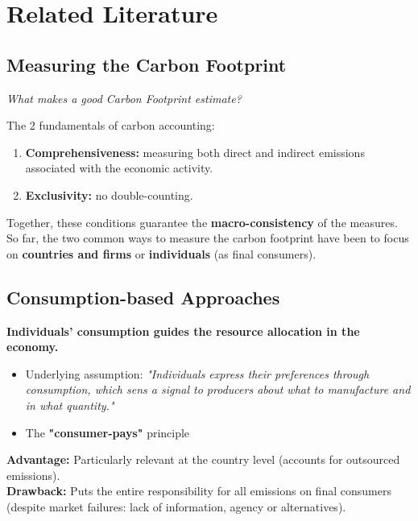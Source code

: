 \documentclass[10pt]{beamer}
\begin{document}
\section{Related Literature}
\begin{frame}
    \tableofcontents[currentsection, hideothersubsections, sections=\value{section}]
\end{frame}

\subsection{Measuring the Carbon Footprint}
\begin{frame}{\subsecname}

    \textit{What makes a good Carbon Footprint estimate?}
    
    The 2 fundamentals of carbon accounting:
        \begin{enumerate}
            \item \textbf{Comprehensiveness:} measuring both direct and indirect emissions associated with the economic activity.
            \item \textbf{Exclusivity:} no double-counting.
        \end{enumerate}
    
    Together, these conditions guarantee the \textbf{macro-consistency} of the measures. \\
    So far, the two common ways to measure the carbon footprint have been to focus on \textbf{countries and firms} or \textbf{individuals} (as final consumers).
\end{frame}

\subsection{Consumption-based Approaches}
\begin{frame}{\subsecname}
    \textbf{Individuals' consumption guides the resource allocation in the economy.}
        \begin{itemize}
            \item Underlying assumption: \textit{"Individuals express their preferences through consumption, which sens a signal to producers about what to manufacture and in what quantity."}
            \item The \textbf{"consumer-pays"} principle
        \end{itemize}
        \textbf{Advantage:} Particularly relevant at the country level (accounts for outsourced emissions). \\
        \textbf{Drawback:} Puts the entire responsibility for all emissions on final consumers (despite market failures: lack of information, agency or alternatives).
\end{frame}
\end{document}
